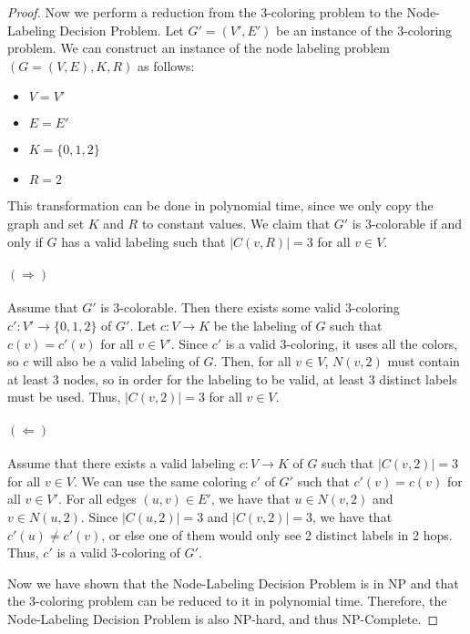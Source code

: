 \documentclass{article}
\begin{document}
\begin{proof}
    Now we perform a reduction from the 3-coloring problem to the Node-Labeling Decision Problem.
    Let $G' = (V', E')$ be an instance of the 3-coloring problem.
    We can construct an instance of the node labeling problem $(G=(V, E), K, R)$ as follows:
    \begin{itemize}
        \item $V = V'$
        \item $E = E'$
        \item $K = \{0, 1, 2\}$
        \item $R = 2$
    \end{itemize}
    This transformation can be done in polynomial time, since we only copy the graph and set $K$ and $R$ to constant values.
    We claim that $G'$ is 3-colorable if and only if $G$ has a valid labeling such that $|C(v, R)| = 3$ for all $v \in V$.

    \paragraph{$(\Rightarrow)$} Assume that $G'$ is 3-colorable.
    Then there exists some valid 3-coloring $c': V' \to \{0, 1, 2\}$ of $G'$.
    Let $c: V \to K$ be the labeling of $G$ such that $c(v) = c'(v)$ for all $v \in V'$.
    Since $c'$ is a valid 3-coloring, it uses all the colors, so $c$ will also be a valid labeling of $G$.
    Then, for all $v \in V$, $N(v, 2)$ must contain at least 3 nodes, so in order for the labeling to be valid, at least 3 distinct labels must be used.
    Thus, $|C(v, 2)| = 3$ for all $v \in V$.

    \paragraph{$(\Leftarrow)$} Assume that there exists a valid labeling $c: V \to K$ of $G$ such that $|C(v, 2)| = 3$ for all $v \in V$.
    We can use the same coloring $c'$ of $G'$ such that $c'(v) = c(v)$ for all $v \in V'$.
    For all edges $(u, v) \in E'$, we have that $u \in N(v, 2)$ and $v \in N(u, 2)$.
    Since $|C(u, 2)| = 3$ and $|C(v, 2)| = 3$, we have that $c'(u) \neq c'(v)$, or else one of them would only see 2 distinct labels in 2 hops.
    Thus, $c'$ is a valid 3-coloring of $G'$.
    
    \vspace{1em}
    Now we have shown that the Node-Labeling Decision Problem is in NP and that the 3-coloring problem can be reduced to it in polynomial time.
    Therefore, the Node-Labeling Decision Problem is also NP-hard, and thus NP-Complete.
\end{proof}
\end{document}
